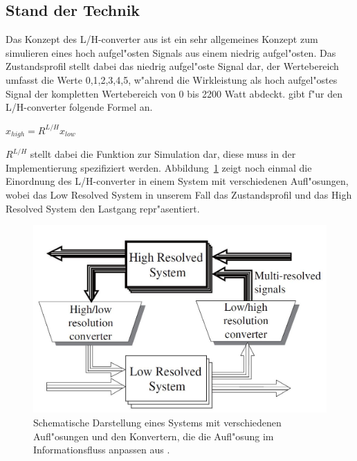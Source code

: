 \subsection{Stand der Technik}
\label{Stand der Technik}
Das Konzept des L/H-converter aus \cite{hara2008multi} ist ein sehr allgemeines Konzept zum simulieren eines hoch aufgel"osten Signals aus einem niedrig aufgel"osten. Das Zustandsprofil stellt dabei das niedrig aufgel"oste Signal dar, der Wertebereich umfasst die Werte 0,1,2,3,4,5, w"ahrend die Wirkleistung als hoch aufgel"ostes Signal der kompletten Wertebereich von 0 bis 2200 Watt abdeckt. \cite{hara2008multi} gibt f"ur den L/H-converter folgende Formel an.\\
\begin{center}
$x_{high} = R^{L/H} x_{low}$
\end{center}
$R^{L/H}$ stellt dabei die Funktion zur Simulation dar, diese muss in der Implementierung spezifiziert werden.
Abbildung~\ref{converter} zeigt noch einmal die Einordnung des L/H-converter in einem System mit verschiedenen Aufl"osungen, wobei das Low Resolved System in unserem Fall das Zustandsprofil und das High Resolved System den Lastgang repr"asentiert. 
\begin{figure}[h]
\includegraphics[height=0.7\textwidth]{1_Grafiken/multiresolved.jpg}
	\caption[Multi Resolved System]{Schematische Darstellung eines Systems mit verschiedenen Aufl"osungen und den Konvertern, die die Aufl"osung im Informationsfluss anpassen aus \cite{hara2008multi}.}
\label{converter}
\end{figure}

